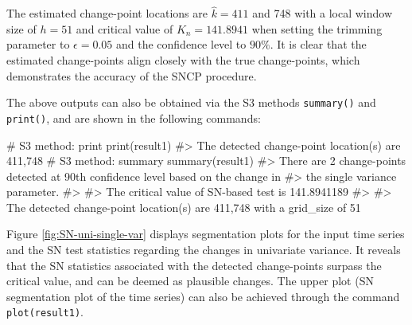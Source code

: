 

The estimated change-point locations are $=411$ and 748 with a local window size of $h=51$ and critical value of $K_n=141.8941$ when setting the trimming parameter to $$ and the confidence level to $90\%$. It is clear that the estimated change-points align closely with the true change-points, which demonstrates the accuracy of the SNCP procedure.  {The above outputs can also be obtained via the S3 methods \texttt{summary()} and \texttt{print()}, and are shown in the following commands: 


\begin{example}
# S3 method: print
print(result1)
#> The detected change-point location(s) are 411,748
# S3 method: summary
summary(result1)
#> There are 2 change-points detected at 90th confidence level based on the change in 
#> the single variance parameter.
#> 
#> The critical value of SN-based test is 141.8941189
#> 
#> The detected change-point location(s) are 411,748 with a grid_size of 51
\end{example} 
}

Figure \ref{fig:SN-uni-single-var} displays segmentation plots for the input time series and the SN test statistics regarding the changes in univariate variance. It reveals that the SN statistics associated with the detected change-points surpass the critical value, and can be deemed as plausible changes. {The upper plot (SN segmentation plot of the time series) can also be achieved through the command \texttt{plot(result1)}.}

